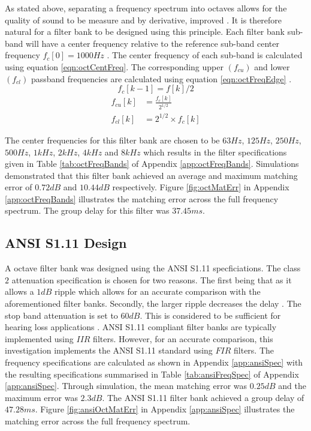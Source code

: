 \documentclass[11pt,onecolumn]{witseiepaper}
\begin{document}
\noindent As stated above, separating a frequency spectrum into octaves allows for the quality of sound to be measure and by derivative, improved \cite{octave}. It is therefore natural for a filter bank to be designed using this principle. Each filter bank sub-band will have a center frequency relative to the reference sub-band center frequency $f_c [0] = 1000Hz$ \cite{octFreqCalc}. The center frequency of each sub-band is calculated using equation \ref{eqn:octCentFreq}. The corresponding upper $(f_{cu})$ and lower $(f_{cl})$ passband frequencies are calculated using equation \ref{eqn:octFreqEdge} \cite{octFreqCalc}.
%
\begin{equation}
\label{eqn:octCentFreq}
f_c[k-1] = f[k]/2 
\end{equation}
\begin{equation}
\begin{aligned}
\label{eqn:octFreqEdge}
f_{cu}[k] &= \frac{f_c[k] }{2^{1/2}}\\
f_{cl}[k] &= 2^{1/2}\times f_c[k]
\end{aligned}
\end{equation}
%

\noindent The center frequencies for this filter bank are chosen to be $63Hz$, $125Hz$, $250Hz$, $500Hz$, $1kHz$, $2kHz$, $4kHz$ and $8kHz$ which results in the filter specifications given in Table \ref{tab:octFreqBands} of Appendix \ref{app:octFreqBands}. Simulations demonstrated that this filter bank achieved an average and maximum matching error of $0.72dB$ and $10.44dB$ respectively. Figure \ref{fig:octMatErr} in Appendix \ref{app:octFreqBands} illustrates the matching error across the full frequency spectrum. The group delay for this filter was $37.45ms$.

\subsection{ANSI S1.11 Design}
\label{sec:ansi}

\noindent A octave filter bank was designed using the ANSI S1.11 specficiations. The class $2$ attenuation specification is chosen for two reasons. The first being that as it allows a $1dB$ ripple which allows for an accurate comparison with the aforementioned filter banks. Secondly, the larger ripple decreases the delay \cite{yang}. The stop band attenuation is set to $60dB$. This is considered to be sufficient for hearing loss applications \cite{ansiAtten}. ANSI S1.11 compliant filter banks are typically implemented using $IIR$ filters. However, for an accurate comparison, this investigation implements the ANSI S1.11 standard using $FIR$ filters. The frequency specifications are calculated as shown in Appendix \ref{app:ansiSpec} with the resulting specifications summarised in Table \ref{tab:ansiFreqSpec} of Appendix \ref{app:ansiSpec}. Through simulation, the mean matching error was $0.25dB$ and the maximum error was $2.3dB$. The ANSI S1.11 filter bank achieved a group delay of $47.28ms$. Figure \ref{fig:ansiOctMatErr} in Appendix \ref{app:ansiSpec} illustrates the matching error across the full frequency spectrum.
\end{document}
